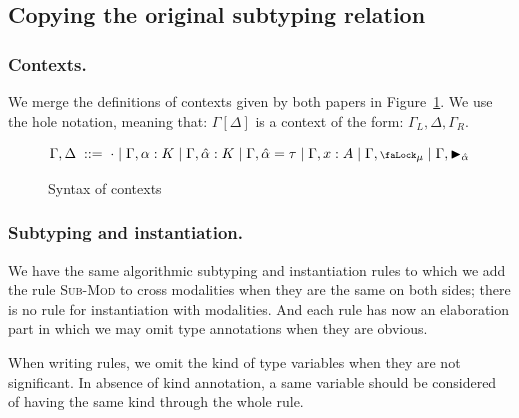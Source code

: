 \documentclass[a4paper,11pt]{article}
\begin{document}
\subsection{Copying the original subtyping relation}
\subsubsection{Contexts.}
We merge the definitions of contexts given by both papers in
Figure~\ref{contexts}. We use the hole notation, meaning that: $\Gamma[\Delta]$
is a context of the form: $\Gamma_L,\Delta,\Gamma_R$.
\begin{figure}[h]
  \[
  \Gamma,\Delta\;::=\;\cdot\mid \Gamma,\alpha:K \mid \Gamma,\hat{\alpha}:K \mid
  \Gamma,\hat{\alpha}=\tau \mid \Gamma, x : A
  \mid \Gamma,\textsf{\scriptsize\faLock}_\mu
  \mid \Gamma, \blacktriangleright_{\hat{\alpha}}
  \]
  \caption{Syntax of contexts}\label{contexts}
\end{figure}


\subsubsection{Subtyping and instantiation.}
We have the same algorithmic subtyping and instantiation rules to which we add
the rule \textsc{Sub-Mod} to cross modalities when they are the same on
both sides; there is no rule for instantiation with modalities. And each rule
has now an elaboration part in which we may omit type annotations when they are
obvious.

When writing rules, we omit the kind of type variables when they are not
significant. In absence of kind annotation, a same variable should be considered
of having the same kind through the whole rule.
\end{document}
